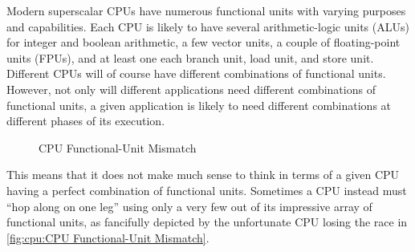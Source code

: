Modern superscalar CPUs have numerous functional units with varying
purposes and capabilities.
Each CPU is likely to have several arithmetic-logic units (ALUs)
for integer and boolean arithmetic, a few vector units, a couple of
floating-point units (FPUs), and at least one each branch unit, load unit,
and store unit.
Different CPUs will of course have different combinations of functional
units.
However, not only will different applications need different combinations
of functional units, a given application is likely to need different
combinations at different phases of its execution.

\begin{figure}
\centering
{}
\caption{CPU Functional-Unit Mismatch}
\end{figure}

This means that it does not make much sense to think in terms of a given
CPU having a perfect combination of functional units.
Sometimes a CPU instead must ``hop along on one leg'' using only a
very few out of its impressive array of functional units, as fancifully
depicted by the unfortunate CPU losing the race in
\cref{fig:cpu:CPU Functional-Unit Mismatch}.

\QuickQuizEnd

